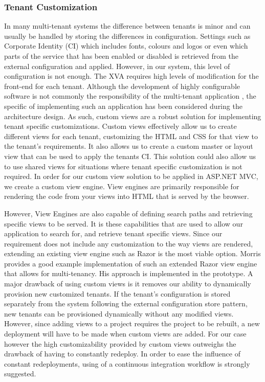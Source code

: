 \subsubsection{\textbf{Tenant Customization}}
\label{sec:viewengine}
In many multi-tenant systems the difference between tenants is minor and can usually be handled by storing the differences in configuration. Settings such as Corporate Identity (CI) which includes fonts, colours and logos or even which parts of the service that has been enabled or disabled is retrieved from the external configuration and applied. However, in our system, this level of configuration is not enough. The XVA requires high levels of modification for the front-end for each tenant. Although the development of highly configurable software is not commonly the responsibility of the multi-tenant application \cite{Krebs2012}, the specific of implementing such an application has been considered during the architecture design. As such, custom views are a robust solution for implementing tenant specific customizations. Custom views effectively allow us to create different views for each tenant, customizing the HTML and CSS for that view to the tenant's requirements. It also allows us to create a custom master or layout view that can be used to apply the tenants CI. This solution could also allow us to use shared views for situations where tenant specific customization is not required. In order for our custom view solution to be applied in ASP.NET  MVC, we create a custom view engine. View engines are primarily responsible for rendering the code from your views into HTML that is served by the browser.

However, View Engines are also capable of defining search paths and retrieving specific views to be served. It is these capabilities that are used to allow our application to search for, and retrieve tenant specific views. Since our requirement does not include any customization to the way views are rendered, extending an existing view engine such as Razor is the most viable option. Morris \cite{Morris} provides a good example implementation of such an extended Razor view engine that allows for multi-tenancy. His approach is implemented in the prototype. A major drawback of using custom views is it removes our ability to dynamically provision new customized tenants. If the tenant's configuration is stored separately from the system following the external configuration store pattern, \cite{Homer2014} new tenants can be provisioned dynamically without any modified views. However, since adding views to a project requires the project to be rebuilt, a new deployment will have to be made when custom views are added. For our case however the high customizability provided by custom views outweighs the drawback of having to constantly redeploy. In order to ease the influence of constant redeployments, using of a continuous integration workflow is strongly suggested.


